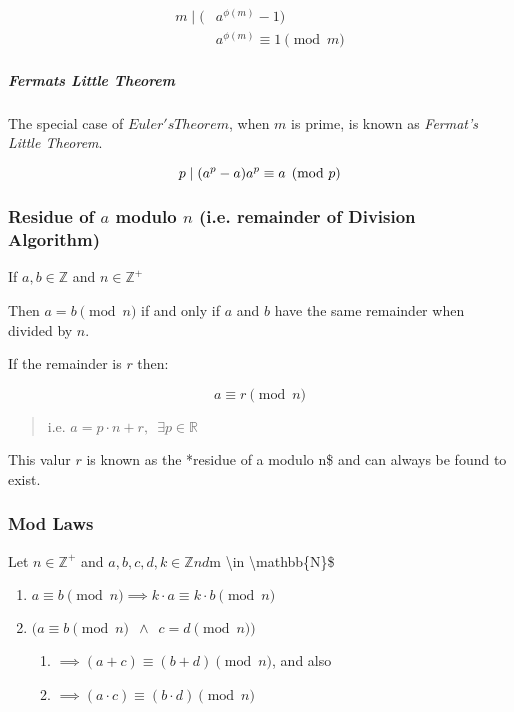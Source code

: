 \documentclass[
]{article}
\begin{document}
\begin{align}
m \mid (&a^{\phi (m)}-1) \\
&a^{\phi (m)} \equiv 1 \pmod{m}
\end{align}

\hypertarget{header-n436}{%
\subparagraph{Fermats Little Theorem}\label{header-n436}}

The special case of \(Euler's Theorem\), when \(m\) is prime, is known
as \emph{Fermat's Little Theorem}.

\[p \mid (a^p-a) \\
a^p \equiv a \pmod{p}\]

\hypertarget{header-n439}{%
\subsubsection{\texorpdfstring{Residue of \(a\) modulo \(n\) (i.e.
remainder of Division
Algorithm)}{Residue of a modulo n (i.e. remainder of Division Algorithm)}}\label{header-n439}}

If \(a,b \in \mathbb{Z}\) and \(n \in \mathbb{Z}^+\)

Then \(a = b \pmod{n}\) if and only if \(a\) and \(b\) have the same
remainder when divided by \(n\).

If the remainder is \(r\) then:

\[a \equiv r \pmod{n}\]

\begin{quote}
i.e. \(a = p\cdot n +r, \enspace \exists p \in \mathbb{R}\)
\end{quote}

This valur \(r\) is known as the *residue of a modulo n\$ and can always
be found to exist.

\hypertarget{header-n447}{%
\subsubsection{Mod Laws}\label{header-n447}}

Let \(n \in \mathbb{Z}^+\) and \( a,b,c,d, k \in \mathbb{Z}
nd \)m \textbackslash in \textbackslash mathbb\{N\}\$

\begin{enumerate}
\def\labelenumi{\arabic{enumi}.}
\item
  \(a \equiv b \pmod{n} \implies k\cdot a \equiv k\cdot b \pmod{n}\)
\item
  \(\Big( a \equiv b \pmod{n} \enspace \wedge \enspace c = d \pmod{n} \Big)\)

  \begin{enumerate}
  \def\labelenumii{\arabic{enumii}.}
  \item
    \(\implies (a+c) \equiv (b+d) \pmod{n}\), and also
  \item
    \(\implies (a\cdot c) \equiv (b\cdot d) \pmod{n}\)
  \end{enumerate}
\end{enumerate}
\end{document}
